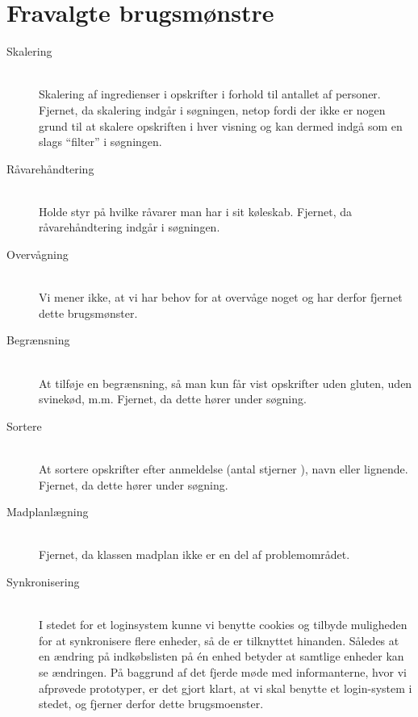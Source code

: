 \chapter{Fravalgte brugsmønstre}
\label{ap:fravalgtebrugsmoenstre}
\begin{description}
\item[Skalering] \hfill \\
Skalering af ingredienser i opskrifter i forhold til antallet af personer.
Fjernet, da skalering indgår i søgningen, netop fordi der ikke er nogen grund til at skalere opskriften i hver visning og kan dermed indgå som en slags “filter” i søgningen.

\item[Råvarehåndtering] \hfill \\
Holde styr på hvilke råvarer man har i sit køleskab.
Fjernet, da råvarehåndtering indgår i søgningen.

\item[Overvågning] \hfill \\
Vi mener ikke, at vi har behov for at overvåge noget og har derfor fjernet dette brugsmønster.

\item[Begrænsning] \hfill \\
At tilføje en begrænsning, så man kun får vist opskrifter uden gluten, uden svinekød, m.m.
Fjernet, da dette hører under søgning.

\item[Sortere] \hfill \\
At sortere opskrifter efter anmeldelse (antal stjerner ), navn eller lignende.
Fjernet, da dette hører under søgning.

\item[Madplanlægning] \hfill \\
Fjernet, da klassen madplan ikke er en del af problemområdet.

\item[Synkronisering] \hfill \\
I stedet for et loginsystem kunne vi benytte cookies og tilbyde muligheden for at synkronisere flere enheder, så de er tilknyttet hinanden. Således at en ændring på indkøbslisten på én enhed betyder at samtlige enheder kan se ændringen. På baggrund af det fjerde møde med informanterne, hvor vi afprøvede prototyper, er det gjort klart, at vi skal benytte et login-system i stedet, og fjerner derfor dette brugsmoenster.
\end{description}
